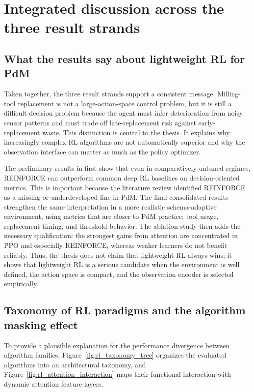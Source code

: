 \documentclass[12pt,oneside]{book}
\begin{document}

\section{Integrated discussion across the three result strands}\label{sec:results-discussion}
\subsection{What the results say about lightweight RL for PdM}
Taken together, the three result strands support a consistent message. Milling-tool replacement is not a large-action-space control problem, but it is still a difficult decision problem because the agent must infer deterioration from noisy sensor patterns and must trade off late-replacement risk against early-replacement waste. This distinction is central to the thesis. It explains why increasingly complex RL algorithms are not automatically superior and why the observation interface can matter as much as the policy optimizer.

The preliminary results in \cite{Siraskar2025} first show that even in comparatively untuned regimes, \textsc{REINFORCE} can outperform common deep RL baselines on decision-oriented metrics. This is important because the literature review identified \textsc{REINFORCE} as a missing or underdeveloped line in PdM. The final consolidated results strengthen the same interpretation in a more realistic schema-adaptive environment, using metrics that are closer to PdM practice: tool usage, replacement timing, and threshold behavior. The ablation study then adds the necessary qualification: the strongest gains from attention are concentrated in PPO and especially \textsc{REINFORCE}, whereas weaker learners do not benefit reliably. Thus, the thesis does not claim that lightweight RL always wins; it shows that lightweight RL is a serious candidate when the environment is well defined, the action space is compact, and the observation encoder is selected empirically.

\subsection{Taxonomy of RL paradigms and the algorithm masking effect}
To provide a plausible explanation for the performance divergence between algorithm families, Figure~\ref{fig:rl_taxonomy_tree} organizes the evaluated algorithms into an architectural taxonomy, and Figure~\ref{fig:rl_attention_interaction} maps their functional interaction with dynamic attention feature layers.
\end{document}
